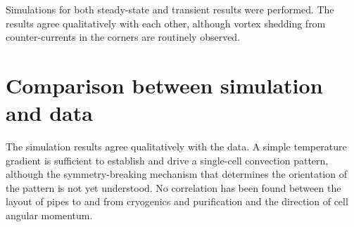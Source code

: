 Simulations for both steady-state and transient results were performed. The results agree qualitatively with each other, although vortex shedding from counter-currents in the corners are routinely observed.

\section{Comparison between simulation and data}

The simulation results agree qualitatively with the data. A simple temperature gradient is sufficient to establish and drive a single-cell convection pattern, although the symmetry-breaking mechanism that determines the orientation of the pattern is not yet understood. No correlation has been found between the layout of pipes to and from cryogenics and purification and the direction of cell angular momentum.

